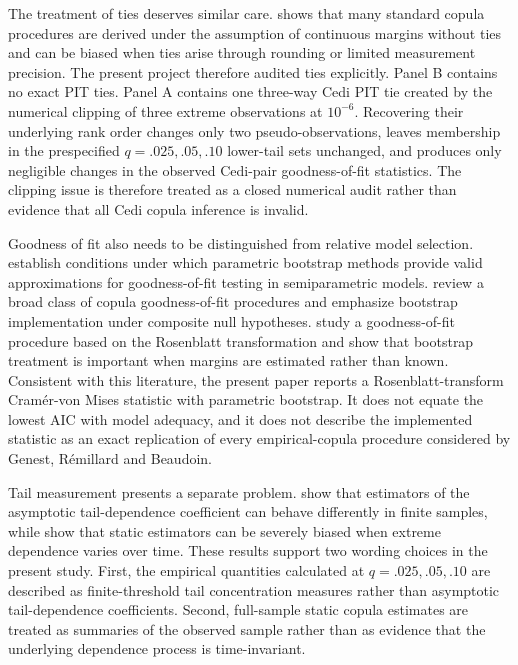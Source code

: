 The treatment of ties deserves similar care. \citet{kojadinovic2017} shows that many standard copula procedures are derived under the assumption of continuous margins without ties and can be biased when ties arise through rounding or limited measurement precision. The present project therefore audited ties explicitly. Panel B contains no exact PIT ties. Panel A contains one three-way Cedi PIT tie created by the numerical clipping of three extreme observations at \(10^{-6}\). Recovering their underlying rank order changes only two pseudo-observations, leaves membership in the prespecified \(q=.025,.05,.10\) lower-tail sets unchanged, and produces only negligible changes in the observed Cedi-pair goodness-of-fit statistics. The clipping issue is therefore treated as a closed numerical audit rather than evidence that all Cedi copula inference is invalid.

Goodness of fit also needs to be distinguished from relative model selection. \citet{genestremillard2008} establish conditions under which parametric bootstrap methods provide valid approximations for goodness-of-fit testing in semiparametric models. \citet{genest2009} review a broad class of copula goodness-of-fit procedures and emphasize bootstrap implementation under composite null hypotheses. \citet{dobric2007} study a goodness-of-fit procedure based on the Rosenblatt transformation and show that bootstrap treatment is important when margins are estimated rather than known. Consistent with this literature, the present paper reports a Rosenblatt-transform Cramér-von Mises statistic with parametric bootstrap. It does not equate the lowest AIC with model adequacy, and it does not describe the implemented statistic as an exact replication of every empirical-copula procedure considered by Genest, Rémillard and Beaudoin.

Tail measurement presents a separate problem. \citet{frahm2005} show that estimators of the asymptotic tail-dependence coefficient can behave differently in finite samples, while \citet{supper2020} show that static estimators can be severely biased when extreme dependence varies over time. These results support two wording choices in the present study. First, the empirical quantities calculated at \(q=.025,.05,.10\) are described as finite-threshold tail concentration measures rather than asymptotic tail-dependence coefficients. Second, full-sample static copula estimates are treated as summaries of the observed sample rather than as evidence that the underlying dependence process is time-invariant.

